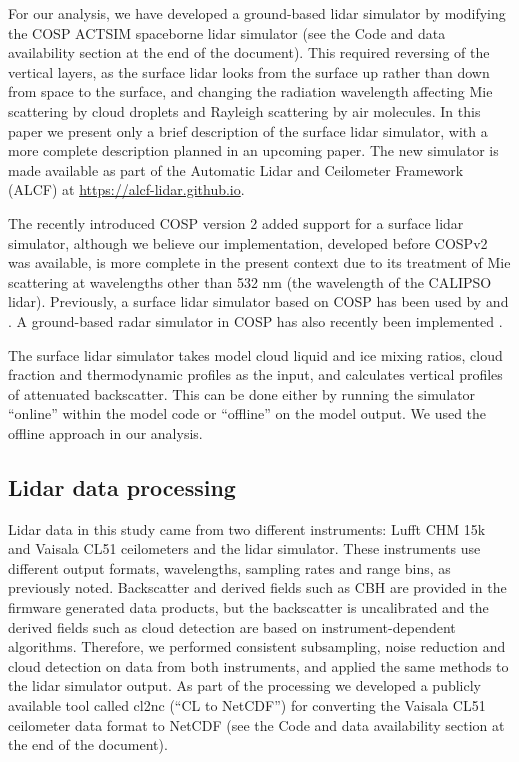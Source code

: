 For our analysis, we have developed a ground-based lidar simulator by modifying
the COSP ACTSIM spaceborne lidar simulator \citep{chiriaco2006} (see
the Code and data availability section at the end of the document). This
required reversing of the vertical layers, as the surface lidar looks from the
surface up rather than down from space to the surface, and changing the
radiation wavelength affecting Mie scattering by cloud droplets and Rayleigh
scattering by air molecules. In this paper we present only a brief description
of the surface lidar simulator, with a more complete description planned in an
upcoming paper. The new simulator is made available as part of the Automatic
Lidar and Ceilometer Framework (ALCF) at \url{https://alcf-lidar.github.io}.

The recently introduced COSP version 2 \citep{swales2018} added support for a
surface lidar simulator, although we believe our implementation, developed
before COSPv2 was available, is more complete in the present context due to its
treatment of Mie scattering at wavelengths other than 532 nm (the wavelength of
the CALIPSO lidar). Previously, a surface lidar simulator based on COSP has
been used by \cite{chiriaco2018} and \cite{bastin2018}. A ground-based radar
simulator in COSP has also recently been implemented \citep{zhang2018}. 

The surface lidar simulator takes model cloud liquid and ice mixing ratios,
cloud fraction and thermodynamic profiles as the input, and calculates vertical
profiles of attenuated backscatter. This can be done either by running the
simulator ``online'' within the model code or ``offline'' on the model output.
We used the offline approach in our analysis.

\subsection{Lidar data processing}
\label{sec:lidar-data-processing}

Lidar data in this study came from two different instruments: Lufft CHM 15k and
Vaisala CL51 ceilometers and the lidar simulator. These instruments use
different output formats, wavelengths, sampling rates and range bins, as
previously noted. Backscatter and derived fields such as CBH are provided in the
firmware generated data products, but the backscatter is uncalibrated and the
derived fields such as cloud detection are based on instrument-dependent
algorithms. Therefore, we performed consistent subsampling, noise reduction and
cloud detection on data from both instruments, and applied the same methods to
the lidar simulator output. As part of the processing we developed a publicly
available tool called cl2nc (``CL to NetCDF'') for converting the Vaisala CL51
ceilometer data format to NetCDF (see the Code and data availability section at
the end of the document).

